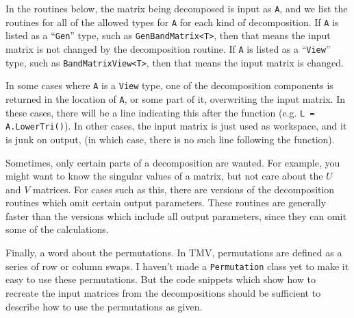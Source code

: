 \documentclass[twoside,letterpaper,11pt]{article}
\renewcommand{\tt}[1]{{\texttt {#1}}}
\begin{document}
In the routines below, the matrix being decomposed is input as \tt{A}, and we
list the routines for all of the 
allowed types for \tt{A} for each kind of decomposition.  If \tt{A} is listed as a ``\tt{Gen}''
type, such as \tt{GenBandMatrix<T>}, then that means the input matrix is not 
changed by the decomposition routine.  
If \tt{A} is listed as a ``\tt{View}'' type,
such as \tt{BandMatrixView<T>}, then that means the input matrix is 
changed.  

In some cases where \tt{A} is a \tt{View} type, one of the decomposition components is 
returned in the location of 
\tt{A}, or some part of it, overwriting the input matrix.  
In these cases, there will be a line indicating this
after the function (e.g. \tt{L = A.LowerTri()}).
In other cases, the input matrix is just used as workspace, and it is junk
on output, (in which case, there is no such line following the function).

Sometimes, only certain parts of a decomposition are wanted.  For example,
you might want to know the singular values of a matrix, but not care about
the $U$ and $V$ matrices.  For cases such as this, there are versions
of the decomposition routines which omit certain output parameters.
These routines are generally faster than the versions which include all
output parameters, since they can omit some of the calculations.

Finally, a word about the permutations.  In TMV, permutations are
defined as a series of row or column swaps.  I haven't made a \tt{Permutation}
class yet to make it easy to use these permutations.  But the 
code snippets which show how to recreate the input matrices from
the decompositions should be sufficient to describe how to use the 
permutations as given.
\end{document}
